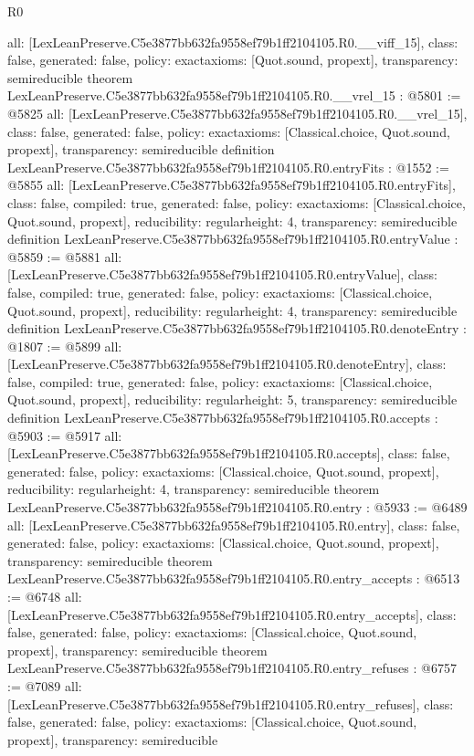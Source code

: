 \begin{lexlean}{R0}
\begin{coremodule}
{  all: [LexLeanPreserve.C5e3877bb632fa9558ef79b1ff2104105.R0.__viff_15],
  class: false,
  generated: false,
  policy: exact{axioms: [Quot.sound, propext]},
  transparency: semireducible
}
theorem LexLeanPreserve.C5e3877bb632fa9558ef79b1ff2104105.R0.__vrel_15 : @5801 := @5825 {
  all: [LexLeanPreserve.C5e3877bb632fa9558ef79b1ff2104105.R0.__vrel_15],
  class: false,
  generated: false,
  policy: exact{axioms: [Classical.choice, Quot.sound, propext]},
  transparency: semireducible
}
definition LexLeanPreserve.C5e3877bb632fa9558ef79b1ff2104105.R0.entryFits : @1552 := @5855 {
  all: [LexLeanPreserve.C5e3877bb632fa9558ef79b1ff2104105.R0.entryFits],
  class: false,
  compiled: true,
  generated: false,
  policy: exact{axioms: [Classical.choice, Quot.sound, propext]},
  reducibility: regular{height: 4},
  transparency: semireducible
}
definition LexLeanPreserve.C5e3877bb632fa9558ef79b1ff2104105.R0.entryValue : @5859 := @5881 {
  all: [LexLeanPreserve.C5e3877bb632fa9558ef79b1ff2104105.R0.entryValue],
  class: false,
  compiled: true,
  generated: false,
  policy: exact{axioms: [Classical.choice, Quot.sound, propext]},
  reducibility: regular{height: 4},
  transparency: semireducible
}
definition LexLeanPreserve.C5e3877bb632fa9558ef79b1ff2104105.R0.denoteEntry : @1807 := @5899 {
  all: [LexLeanPreserve.C5e3877bb632fa9558ef79b1ff2104105.R0.denoteEntry],
  class: false,
  compiled: true,
  generated: false,
  policy: exact{axioms: [Classical.choice, Quot.sound, propext]},
  reducibility: regular{height: 5},
  transparency: semireducible
}
definition LexLeanPreserve.C5e3877bb632fa9558ef79b1ff2104105.R0.accepts : @5903 := @5917 {
  all: [LexLeanPreserve.C5e3877bb632fa9558ef79b1ff2104105.R0.accepts],
  class: false,
  generated: false,
  policy: exact{axioms: [Classical.choice, Quot.sound, propext]},
  reducibility: regular{height: 4},
  transparency: semireducible
}
theorem LexLeanPreserve.C5e3877bb632fa9558ef79b1ff2104105.R0.entry : @5933 := @6489 {
  all: [LexLeanPreserve.C5e3877bb632fa9558ef79b1ff2104105.R0.entry],
  class: false,
  generated: false,
  policy: exact{axioms: [Classical.choice, Quot.sound, propext]},
  transparency: semireducible
}
theorem LexLeanPreserve.C5e3877bb632fa9558ef79b1ff2104105.R0.entry_accepts : @6513 := @6748 {
  all: [LexLeanPreserve.C5e3877bb632fa9558ef79b1ff2104105.R0.entry_accepts],
  class: false,
  generated: false,
  policy: exact{axioms: [Classical.choice, Quot.sound, propext]},
  transparency: semireducible
}
theorem LexLeanPreserve.C5e3877bb632fa9558ef79b1ff2104105.R0.entry_refuses : @6757 := @7089 {
  all: [LexLeanPreserve.C5e3877bb632fa9558ef79b1ff2104105.R0.entry_refuses],
  class: false,
  generated: false,
  policy: exact{axioms: [Classical.choice, Quot.sound, propext]},
  transparency: semireducible
}


\end{coremodule}
\end{lexlean}
